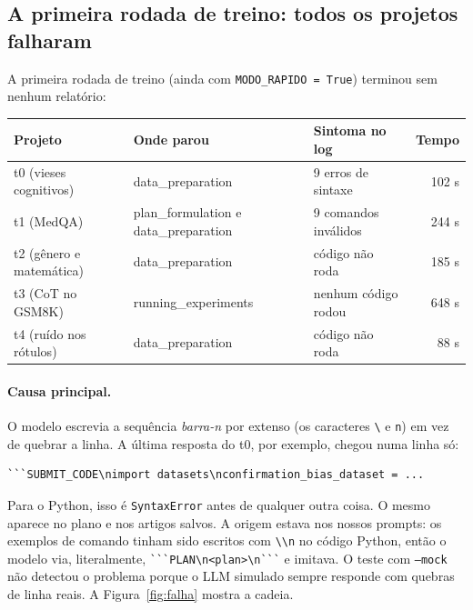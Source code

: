 \documentclass[11pt,a4paper]{article}
\newcommand{\fase}[1]{\textsf{#1}}
\begin{document}
\subsection{A primeira rodada de treino: todos os projetos falharam}

A primeira rodada de treino (ainda com \texttt{MODO\_RAPIDO = True}) terminou sem nenhum
relatório:

\begin{center}
\small
\begin{tabular}{lllr}
\toprule
Projeto & Onde parou & Sintoma no log & Tempo \\
\midrule
t0 (vieses cognitivos) & \fase{data\_preparation} & 9 erros de sintaxe & 102 s \\
t1 (MedQA) & \fase{plan\_formulation} e \fase{data\_preparation} & 9 comandos inválidos & 244 s \\
t2 (gênero e matemática) & \fase{data\_preparation} & código não roda & 185 s \\
t3 (CoT no GSM8K) & \fase{running\_experiments} & nenhum código rodou & 648 s \\
t4 (ruído nos rótulos) & \fase{data\_preparation} & código não roda & 88 s \\
\bottomrule
\end{tabular}
\end{center}

\paragraph{Causa principal.} O modelo escrevia a sequência \emph{barra-n} por extenso
(os caracteres \texttt{\textbackslash} e \texttt{n}) em vez de quebrar a linha. A última
resposta do t0, por exemplo, chegou numa linha só:

\begin{small}
\begin{verbatim}
```SUBMIT_CODE\nimport datasets\nconfirmation_bias_dataset = ...
\end{verbatim}
\end{small}

Para o Python, isso é \texttt{SyntaxError} antes de qualquer outra coisa. O mesmo aparece
no plano e nos artigos salvos. A origem estava nos nossos prompts: os exemplos de comando
tinham sido escritos com \texttt{\textbackslash\textbackslash n} no código Python, então o
modelo via, literalmente, \verb|```PLAN\n<plan>\n```| e imitava. O teste com
\texttt{--mock} não detectou o problema porque o LLM simulado sempre responde com quebras de
linha reais. A Figura~\ref{fig:falha} mostra a cadeia.
\end{document}
